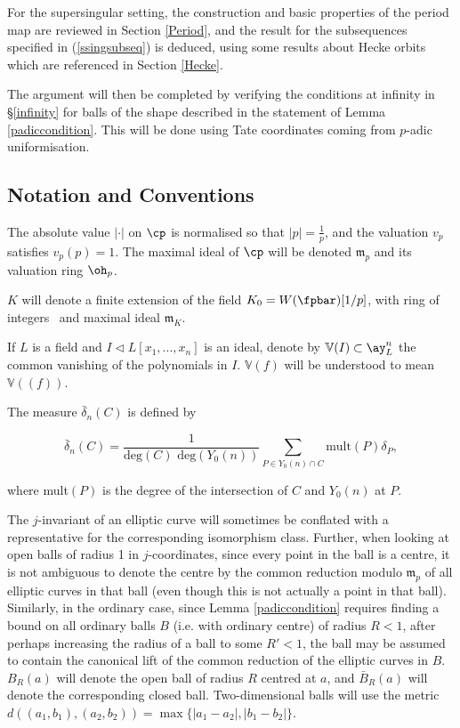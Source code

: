 \documentclass[12pt,letterpaper]{article}
\begin{document}
	
	For the supersingular setting, the construction and basic properties of the period map are reviewed in Section \ref{Period}, and the result for the subsequences specified in (\ref{ssingsubseq}) is deduced, using some results about Hecke orbits which are referenced in Section \ref{Hecke}.
	

	The argument will then be completed by verifying the conditions at infinity in \S\ref{infinity} for balls of the shape described in the statement of Lemma \ref{padiccondition}. This will be done using Tate coordinates coming from $p$-adic uniformisation.
	
	
	
	
	\subsection{Notation and Conventions}\label{Notation}
	
	The absolute value $|\cdot|$ on $\cp$ is normalised so that $|p|=\frac{1}{p}$, and the valuation $v_p$ satisfies $v_p(p)=1$. The maximal ideal of $\cp$ will be denoted $\mathfrak{m}_p$ and its valuation ring $\oh_p$.
	
	$K$ will denote a finite extension of the field $K_0=W(\fpbar)[1/p]$, with ring of integers \ok\ and maximal ideal $\mathfrak{m}_K$.
	
	If $L$ is a field and $I\triangleleft L[x_1,...,x_n]$ is an ideal, denote by $\mathbb{V}(I) \subset \ay^n_L$ the common vanishing of the polynomials in $I$. $\mathbb{V}(f)$ will be understood to mean $\mathbb{V}((f))$.
	
	The measure $\bar{\delta}_n(C)$ is defined by
	
	\[\bar{\delta}_n(C)= \frac{1}{\text{deg}(C)\text{ deg}(Y_0(n))} \sum_{P\in Y_0(n)\cap C} \text{mult}(P)\delta_P,\] 
	
	where mult$(P)$ is the degree of the intersection of $C$ and $Y_0(n)$ at $P$.
	
	The $j$-invariant of an elliptic curve will sometimes be conflated with a representative for the corresponding isomorphism class. Further, when looking at open balls of radius 1 in $j$-coordinates, since every point in the ball is a centre, it is not ambiguous to denote the centre by the common reduction modulo $\mathfrak{m}_p$ of all elliptic curves in that ball (even though this is not actually a point in that ball). Similarly, in the ordinary case, since Lemma \ref{padiccondition} requires finding a bound on all ordinary balls $B$ (i.e. with ordinary centre) of radius $R<1$, after perhaps increasing the radius of a ball to some $R'<1$, the ball may be assumed to contain the canonical lift of the common reduction of the elliptic curves in $B$. $B_R(a)$ will denote the open ball of radius $R$ centred at $a$, and $\bar{B}_R(a)$ will denote the corresponding closed ball. Two-dimensional balls will use the metric $d((a_1,b_1),(a_2,b_2)) = \max\{|a_1-a_2|,|b_1-b_2|\}$.
	
\end{document}
